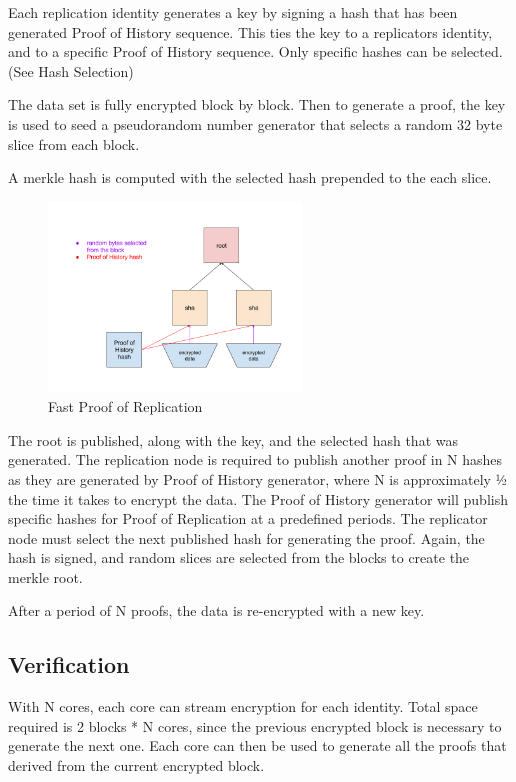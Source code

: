 \documentclass[12pt]{article}
\begin{document}
Each replication identity generates a key by signing a hash that has been generated Proof of History sequence.  This ties the key to a replicators identity, and to a specific Proof of History sequence.  Only specific hashes can be selected.  (See Hash Selection)

The data set is fully encrypted block by block.  Then to generate a proof, the key is used to seed a pseudorandom number generator that selects a random 32 byte slice from each block.

A merkle hash is computed with the selected hash prepended to the each slice.

\begin{figure}
  \begin{center}
    \centering
    \includegraphics[width=0.6\textwidth]{figures/fig_8.png}
    \caption[Fig 8]{Fast Proof of Replication\label{fig_8}}
  \end{center}
  \end{figure}

The root is published, along with the key, and the selected hash that was generated.  The replication node is required to publish another proof in N hashes as they are generated by Proof of History generator, where N is approximately ½ the time it takes to encrypt the data.  The Proof of History generator will publish specific hashes for Proof of Replication at a predefined periods.  The replicator node must select the next published hash for generating the proof.  Again, the hash is signed, and random slices are selected from the blocks to create the merkle root.

After a period of N proofs, the data is re-encrypted with a new key.
\subsection{Verification}

With N cores, each core can stream encryption for each identity.  Total space required is 2 blocks * N cores, since the previous encrypted block is necessary to generate the next one. Each core can then be used to generate all the proofs that derived from the current encrypted block.
\end{document}
